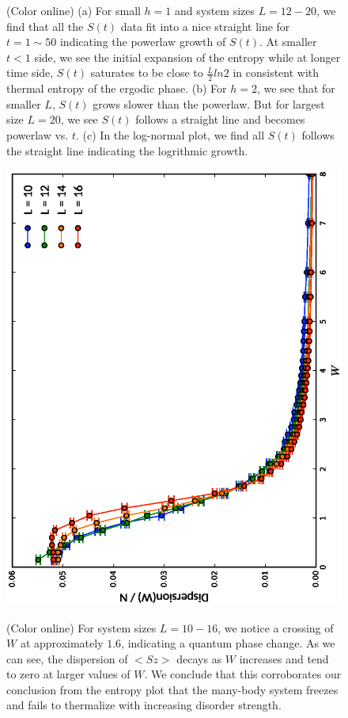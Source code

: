 \documentclass[prl,aps,epsf,showpacs,twocolumn]{revtex4}
\begin{document}
\begin{figure}[b]
\caption{(Color online) (a) For small $h=1$ and system sizes $L=12-20$,   we find that 
all the $S(t)$ data fit into a nice straight line for $t=1\sim 50$ indicating the powerlaw growth of $S(t)$.
At smaller $t<1$ side,  we see the initial expansion of the entropy  while at longer time  side, $S(t)$ saturates
to be close to $\frac L 2 ln2$ in consistent with thermal entropy of the ergodic phase.
(b) For $h=2$,  we see that for smaller $L$, $S(t)$ grows slower than the powerlaw.
But for largest size $L=20$, we see $S(t)$ follows a straight line and becomes powerlaw vs. $t$.
(c) In the log-normal plot, we find all $S(t)$ follows the straight line indicating the 
logrithmic growth.
 }
\label{fig3}
\end{figure} 


\begin{figure}
  \includegraphics[angle=-90,width=0.92\linewidth]{dispersion_plot.ps} \\
  \caption{(Color online) For system sizes $L = 10-16$, we notice a crossing of $W$ at approximately $1.6$,
    indicating a quantum phase change. As we can see, the dispersion of $<Sz>$ decays as $W$ increases and tend
    to zero at larger values of $W$. We conclude that this corroborates our conclusion from the entropy plot
  that the many-body system freezes and fails to thermalize with increasing disorder strength.}
\end{figure}
\end{document}
